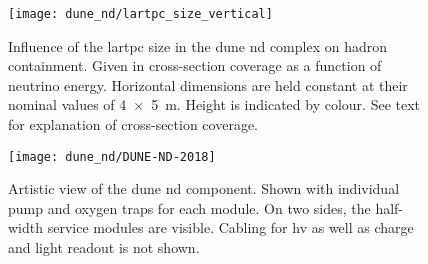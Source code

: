 \begin{figure}[htb]
	\centering
	\texttt{[image: dune\_nd/lartpc\_size\_vertical]}
	\caption[\AC{}   hadron containment]{%
		Influence of the \acrshort{lartpc} size in the \acrshort{dune} \acrshort{nd} complex on hadron containment.
		Given in cross-section coverage as a function of neutrino energy.
		Horizontal dimensions are held constant at their nominal values of \SI{4 x 5}{\metre}.
		Height is indicated by colour.
		See text for explanation of cross-section coverage.
	}
	\label{fig:dune-nd_lartpc-size}
\end{figure}

\begin{figure}[htb]
	\centering
	\texttt{[image: dune\_nd/DUNE-ND-2018]}
	\caption[\AC{}   artistic view]{%
		Artistic view of the \acrshort{dune} \acrshort{nd} \AC{} component.
		Shown with individual pump and oxygen traps for each module.
		On two sides, the half-width service modules are visible.
		Cabling for \acrshort{hv} as well as charge and light readout is not shown.
	}
	\label{fig:dune-nd_ac}
\end{figure}

